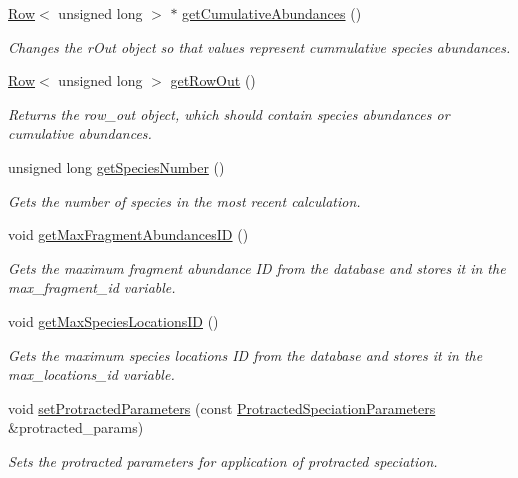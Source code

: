 \begin{DoxyCompactItemize}
\hyperlink{class_row}{Row}$<$ unsigned long $>$ $\ast$ \hyperlink{class_community_a51d90183f6a26e7d192abfd748945f2b}{get\+Cumulative\+Abundances} ()
\begin{DoxyCompactList}\small\item\em Changes the r\+Out object so that values represent cummulative species abundances. \end{DoxyCompactList}\item 
\hyperlink{class_row}{Row}$<$ unsigned long $>$ \hyperlink{class_community_a63fd8d32af6d52d009d1fd54098e4594}{get\+Row\+Out} ()
\begin{DoxyCompactList}\small\item\em Returns the row\+\_\+out object, which should contain species abundances or cumulative abundances. \end{DoxyCompactList}\item 
unsigned long \hyperlink{class_community_a8523432488d6586521c5994cad4215d8}{get\+Species\+Number} ()
\begin{DoxyCompactList}\small\item\em Gets the number of species in the most recent calculation. \end{DoxyCompactList}\item 
void \hyperlink{class_community_af6fe28e1047ed5b56fde833e4b2b30de}{get\+Max\+Fragment\+Abundances\+ID} ()
\begin{DoxyCompactList}\small\item\em Gets the maximum fragment abundance ID from the database and stores it in the max\+\_\+fragment\+\_\+id variable. \end{DoxyCompactList}\item 
void \hyperlink{class_community_a04d65ed53ea9e2cb6ce02dddccf3d33e}{get\+Max\+Species\+Locations\+ID} ()
\begin{DoxyCompactList}\small\item\em Gets the maximum species locations ID from the database and stores it in the max\+\_\+locations\+\_\+id variable. \end{DoxyCompactList}\item 
void \hyperlink{class_community_aca6eb26336c882ac41601ef06495f421}{set\+Protracted\+Parameters} (const \hyperlink{struct_protracted_speciation_parameters}{Protracted\+Speciation\+Parameters} \&protracted\+\_\+params)
\begin{DoxyCompactList}\small\item\em Sets the protracted parameters for application of protracted speciation. \end{DoxyCompactList}\item 

\end{DoxyCompactItemize}
